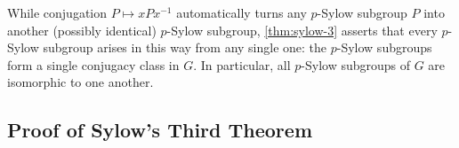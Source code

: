 \begin{content}

\begin{steps}
While conjugation $P \mapsto x P x^{-1}$ automatically turns any $p$-Sylow subgroup $P$ into another (possibly identical) $p$-Sylow subgroup, \cref{thm:sylow-3} asserts that every $p$-Sylow subgroup arises in this way from any single one: the $p$-Sylow subgroups form a single conjugacy class in $G$. In particular, all $p$-Sylow subgroups of $G$ are isomorphic to one another.
\end{steps}
\end{content}

\subsection{Proof of Sylow's Third Theorem}

